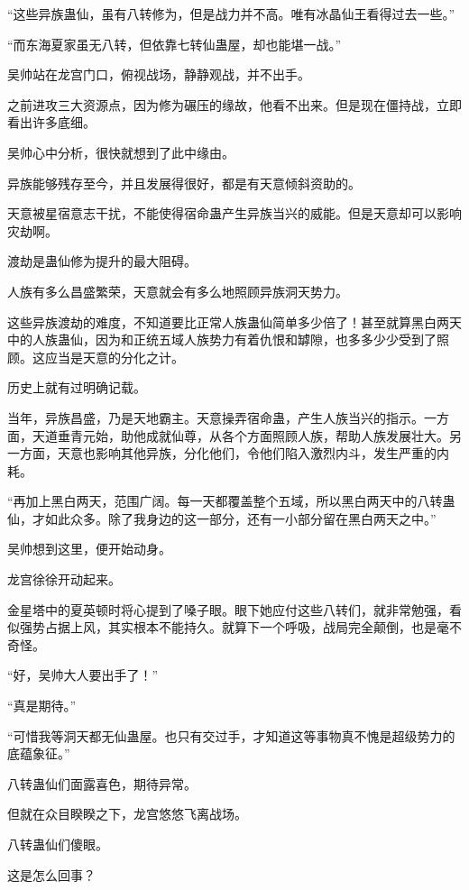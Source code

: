 
\begin{this_body}

“这些异族蛊仙，虽有八转修为，但是战力并不高。唯有冰晶仙王看得过去一些。”

“而东海夏家虽无八转，但依靠七转仙蛊屋，却也能堪一战。”

吴帅站在龙宫门口，俯视战场，静静观战，并不出手。

之前进攻三大资源点，因为修为碾压的缘故，他看不出来。但是现在僵持战，立即看出许多底细。

吴帅心中分析，很快就想到了此中缘由。

异族能够残存至今，并且发展得很好，都是有天意倾斜资助的。

天意被星宿意志干扰，不能使得宿命蛊产生异族当兴的威能。但是天意却可以影响灾劫啊。

渡劫是蛊仙修为提升的最大阻碍。

人族有多么昌盛繁荣，天意就会有多么地照顾异族洞天势力。

这些异族渡劫的难度，不知道要比正常人族蛊仙简单多少倍了！甚至就算黑白两天中的人族蛊仙，因为和正统五域人族势力有着仇恨和罅隙，也多多少少受到了照顾。这应当是天意的分化之计。

历史上就有过明确记载。

当年，异族昌盛，乃是天地霸主。天意操弄宿命蛊，产生人族当兴的指示。一方面，天道垂青元始，助他成就仙尊，从各个方面照顾人族，帮助人族发展壮大。另一方面，天意也影响其他异族，分化他们，令他们陷入激烈内斗，发生严重的内耗。

“再加上黑白两天，范围广阔。每一天都覆盖整个五域，所以黑白两天中的八转蛊仙，才如此众多。除了我身边的这一部分，还有一小部分留在黑白两天之中。”

吴帅想到这里，便开始动身。

龙宫徐徐开动起来。

金星塔中的夏英顿时将心提到了嗓子眼。眼下她应付这些八转们，就非常勉强，看似强势占据上风，其实根本不能持久。就算下一个呼吸，战局完全颠倒，也是毫不奇怪。

“好，吴帅大人要出手了！”

“真是期待。”

“可惜我等洞天都无仙蛊屋。也只有交过手，才知道这等事物真不愧是超级势力的底蕴象征。”

八转蛊仙们面露喜色，期待异常。

但就在众目睽睽之下，龙宫悠悠飞离战场。

八转蛊仙们傻眼。

这是怎么回事？


\end{this_body}
